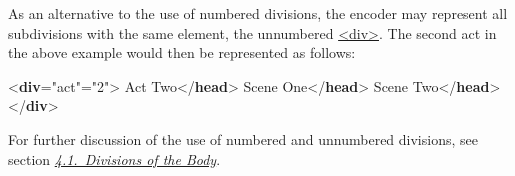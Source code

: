 As an alternative to the use of numbered divisions, the encoder may represent all subdivisions with the same element, the unnumbered \hyperref[TEI.div]{<div>}. The second act in the above example would then be represented as follows: \par\bgroup{}\exampleFont \begin{shaded}\noindent\mbox{}{<\textbf{div}\hspace*{1em}{type}="{act}"\hspace*{1em}{n}="{2}">}\mbox{}\newline 
{}Act Two{</\textbf{head}>}\mbox{}\newline 
{}\mbox{}\newline 
\hspace*{1em}Scene One{</\textbf{head}>}\mbox{}\newline 
{}\mbox{}\newline 
{}\mbox{}\newline 
\hspace*{1em}Scene Two{</\textbf{head}>}\mbox{}\newline 
{}\mbox{}\newline 
{</\textbf{div}>}\end{shaded}\egroup\par \par
For further discussion of the use of numbered and unnumbered divisions, see section \textit{\hyperref[DSDIV]{4.1.\ Divisions of the Body}}.
